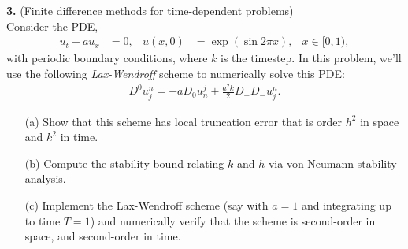 \documentclass[11pt]{amsart}
\begin{document}
  \textbf{3.} (Finite difference methods for time-dependent problems)\\
  Consider the PDE,
  \begin{align*}
    u_t + a u_x &= 0, & u(x,0) &= \exp(\sin 2 \pi x), & x \in [0, 1),
  \end{align*}
  with periodic boundary conditions, where $k$ is the timestep. In this problem, we'll use the following \textit{Lax-Wendroff} scheme to numerically solve this PDE:
  \begin{align*}
    D^0 u_j^n = -a D_0 u^j_n + \frac{a^2 k}{2} D_+ D_- u_j^n.
  \end{align*}
  \begin{itemize}
    \item[(a)] Show that this scheme has local truncation error that is order $h^2$ in space and $k^2$ in time.
    \item[(b)] Compute the stability bound relating $k$ and $h$ via von Neumann stability analysis.
    \item[(c)] Implement the Lax-Wendroff scheme (say with $a = 1$ and integrating up to time $T=1$) and numerically verify that the scheme is second-order in space, and second-order in time.
  \end{itemize}

%
%
\end{document}
